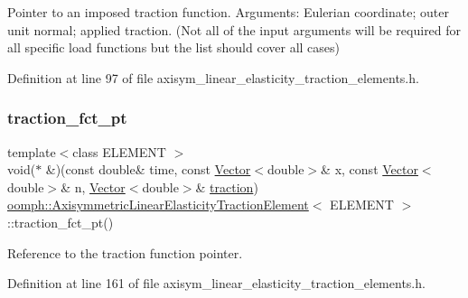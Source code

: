 Pointer to an imposed traction function. Arguments\+: Eulerian coordinate; outer unit normal; applied traction. (Not all of the input arguments will be required for all specific load functions but the list should cover all cases) 



Definition at line 97 of file axisym\+\_\+linear\+\_\+elasticity\+\_\+traction\+\_\+elements.\+h.

\mbox{\label{classoomph_1_1AxisymmetricLinearElasticityTractionElement_a9c705a2b7379c63cc70c8e1e2aa6676d}} 
\subsubsection{\texorpdfstring{traction\+\_\+fct\+\_\+pt}{traction\_fct\_pt}}
{\footnotesize\ttfamily template$<$class E\+L\+E\+M\+E\+NT $>$ \\
void($\ast$ \&)(const double\& time, const \hyperlink{classoomph_1_1Vector}{Vector}$<$double$>$\& x, const \hyperlink{classoomph_1_1Vector}{Vector}$<$double$>$\& n, \hyperlink{classoomph_1_1Vector}{Vector}$<$double$>$\& \hyperlink{classoomph_1_1AxisymmetricLinearElasticityTractionElement_a28af87bac3d8d0c935564e69277e215e}{traction}) \hyperlink{classoomph_1_1AxisymmetricLinearElasticityTractionElement}{oomph\+::\+Axisymmetric\+Linear\+Elasticity\+Traction\+Element}$<$ E\+L\+E\+M\+E\+NT $>$\+::traction\+\_\+fct\+\_\+pt()\hspace{0.3cm}{\ttfamily [inline]}}



Reference to the traction function pointer. 



Definition at line 161 of file axisym\+\_\+linear\+\_\+elasticity\+\_\+traction\+\_\+elements.\+h.

\mbox{\label{classoomph_1_1AxisymmetricLinearElasticityTractionElement_a2b4e580e5a53714c55b606575ad89669}} 
